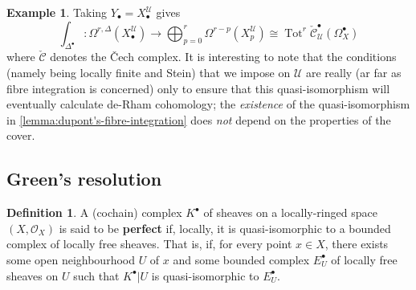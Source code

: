 \documentclass[11pt,fleqn]{article}
\theoremstyle{plain}
\theoremstyle{definition}
\newtheorem{definition}[theorem]{Definition}
\newtheorem{example}[theorem]{Example}
\theoremstyle{remark}
\numberwithin{equation}{theorem}
\newcommand{\cover}{\mathcal{U}}
\newcommand{\OO}{\mathcal{O}}
\newcommand{\restricted}{\mathbin{\big\vert}}
\newcommand{\cech}{\check{\mathscr{C}}}
\newcommand{\define}[1]{\textbf{#1}}
\newcommand{\nerve}[1]{X_{#1}^\cover}
\DeclareMathOperator{\Tot}{Tot}
\begin{document}
        \begin{example}\label{example:fibre-integration-gives-cech-de-rham}
            Taking $Y_\bullet=\nerve{\bullet}$ gives
            \[
                \int_{\Delta^\bullet}\colon \Omega^{r,\Delta}({\nerve{\bullet}})
                \to
                \bigoplus_{p=0}^r\Omega^{r-p}({\nerve{p}})
                \cong
                \Tot^r\cech_\cover^\bullet(\Omega^\bullet_X)
            \]
            where $\cech$ denotes the Čech complex.
            It is interesting to note that the conditions (namely being locally finite and Stein) that we impose on $\cover$ are really (ar far as fibre integration is concerned) only to ensure that this quasi-isomorphism will eventually calculate de-Rham cohomology; the \emph{existence} of the quasi-isomorphism in \cref{lemma:dupont's-fibre-integration} does \emph{not} depend on the properties of the cover.
        \end{example}


    \subsection{Green's resolution}

        \begin{definition}
            A (cochain) complex $K^\bullet$ of sheaves on a locally-ringed space $(X,\OO_X)$ is said to be \define{perfect} if, locally, it is quasi-isomorphic to a bounded complex of locally free sheaves.
            That is, if, for every point $x\in X$, there exists some open neighbourhood $U$ of $x$ and some bounded complex $E^\bullet_U$ of locally free sheaves on $U$ such that $K^\bullet\restricted U$ is quasi-isomorphic to $E^\bullet_U$.
        \end{definition}
\end{document}
